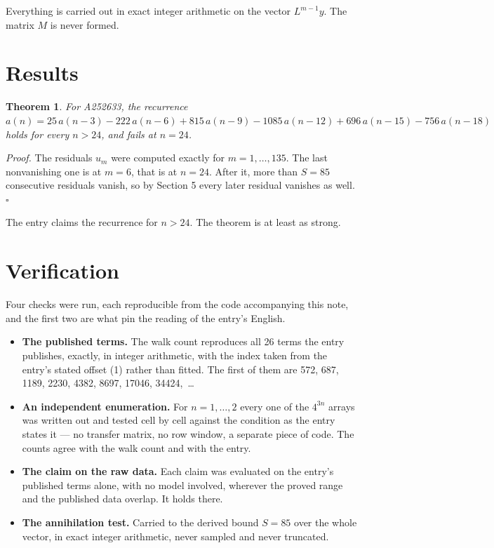 \documentclass[11pt]{article}
\newtheorem{theorem}{Theorem}
\theoremstyle{definition}
\begin{document}
Everything is carried out in exact integer arithmetic on the vector $L^{m-1}y$. The matrix $M$ is never formed.

\section{Results}

\begin{theorem} For A252633, the recurrence $a(n) = 25\,a(n-3) - 222\,a(n-6) + 815\,a(n-9) - 1085\,a(n-12) + 696\,a(n-15) - 756\,a(n-18)$ holds for every $n > 24$, and fails at $n = 24$.\end{theorem}

{\itshape Proof.} The residuals $u_m$ were computed exactly for $m = 1,\dots,135$. The last nonvanishing one is at $m = 6$, that is at $n = 24$. After it, more than $S = 85$ consecutive residuals vanish, so by Section 5 every later residual vanishes as well. $\square$

The entry claims the recurrence for $n > 24$. The theorem is at least as strong.

\section{Verification}

Four checks were run, each reproducible from the code accompanying this note, and the first two are what pin the reading of the entry's English.

\begin{itemize}

\item {\bfseries The published terms.} The walk count reproduces all 26 terms the entry publishes, exactly, in integer arithmetic, with the index taken from the entry's stated offset (1) rather than fitted. The first of them are 572, 687, 1189, 2230, 4382, 8697, 17046, 34424,~\dots

\item {\bfseries An independent enumeration.} For $n = 1,\dots,2$ every one of the $4^{3n}$ arrays was written out and tested cell by cell against the condition as the entry states it --- no transfer matrix, no row window, a separate piece of code. The counts agree with the walk count and with the entry.

\item {\bfseries The claim on the raw data.} Each claim was evaluated on the entry's published terms alone, with no model involved, wherever the proved range and the published data overlap. It holds there.

\item {\bfseries The annihilation test.} Carried to the derived bound $S = 85$ over the whole vector, in exact integer arithmetic, never sampled and never truncated.

\end{itemize}
\end{document}
